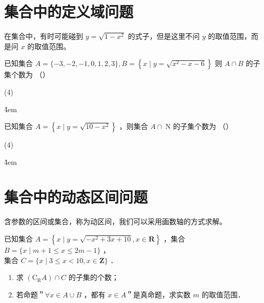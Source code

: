 \section{集合中的定义域问题}

\begin{tips}
    在集合中，有时可能碰到 $ y=\sqrt{1-x^2}$ 的式子，但是这里不问 $y$ 的取值范围，而是问 $x$ 的取值范围。
\end{tips}

\begin{example}
    已知集合 $A=\{-3,-2,-1,0,1,2,3\}, B=\left\{x \mid y=\sqrt{x^2-x-6}\right\}$ 则 $A \cap B$ 的子集个数为 （\qquad）
    \begin{tasks}(4)
    \end{tasks}
\end{example}

\v{4em}

\begin{example}
    已知集合 $A=\left\{x \mid y=\sqrt{10-x^2}\right\}$ ，则集合 $A \cap \mathrm{~N}$ 的子集个数为 （\qquad）
    \begin{tasks}(4)
    \end{tasks}
\end{example}

\v{4em}

\section{集合中的动态区间问题}

\begin{theorem}
    含参数的区间或集合，称为动区间，我们可以采用画数轴的方式求解。
\end{theorem}

\begin{example}
    已知集合 $A=\left\{x \mid y=\sqrt{-x^2+3 x+10}, x \in \mathbf{R}\right\}$ ，集合 $B=\{x \mid m+1 \leq x \leq 2 m-1\}$ ，\\ 集合 $C=\{x \mid 3 \leq x<10, x \in \mathbf{Z}\}$ ．
    \begin{enumerate}
        \item 求 $\left(\mathrm{C}_{\mathrm{R}} A\right) \cap C$ 的子集的个数；
        \item 若命题＂$\forall x \in A \cup B$ ，都有 $x \in A$＂是真命题，求实数 $m$ 的取值范围．
    \end{enumerate}
\end{example}

